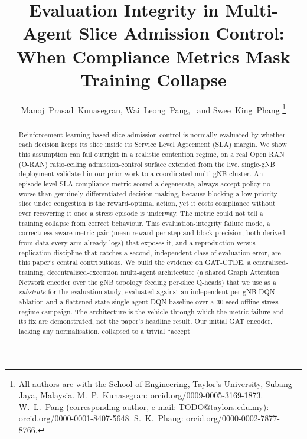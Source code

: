 \documentclass[journal]{IEEEtran}
\begin{document}
\title{Evaluation Integrity in Multi-Agent Slice Admission Control:\\When Compliance Metrics Mask Training Collapse}

\author{Manoj~Prasad~Kunasegran, Wai~Leong~Pang,~ and Swee~King~Phang
\thanks{All authors are with the School of Engineering, Taylor's University, Subang Jaya, Malaysia. M.~P.~Kunasegran: orcid.org/0009-0005-3169-1873. W.~L.~Pang (corresponding author, e-mail: TODO@taylors.edu.my): orcid.org/0000-0001-8407-5648. S.~K.~Phang: orcid.org/0000-0002-7877-8766.}}

\maketitle

\begin{abstract}
Reinforcement-learning-based slice admission control is normally
evaluated by whether each decision keeps its slice inside its Service
Level Agreement (SLA) margin. We show this assumption can fail
outright in a realistic contention regime, on a real Open RAN (O-RAN)
ratio-ceiling admission-control surface extended from the live,
single-gNB deployment validated in our prior work to a coordinated
multi-gNB cluster. An episode-level SLA-compliance metric scored a
degenerate, always-accept policy no worse than genuinely
differentiated decision-making, because blocking a low-priority slice
under congestion is the reward-optimal action, yet it costs compliance
without ever recovering it once a stress episode is underway. The
metric could not tell a training collapse from correct behaviour. This
evaluation-integrity failure mode, a correctness-aware metric pair
(mean reward per step and block precision, both derived from data
every arm already logs) that exposes it, and a reproduction-versus-
replication discipline that catches a second, independent class of
evaluation error, are this paper's central contributions. We build the
evidence on GAT-CTDE, a centralised-training, decentralised-execution
multi-agent architecture (a shared Graph Attention Network encoder
over the gNB topology feeding per-slice Q-heads) that we use as a
\emph{substrate} for the evaluation study, evaluated against an
independent per-gNB DQN ablation and a flattened-state single-agent
DQN baseline over a 30-seed offline stress-regime campaign. The
architecture is the vehicle through which the metric failure and its
fix are demonstrated, not the paper's headline result. Our initial GAT
encoder, lacking any normalisation, collapsed to a trivial ``accept

\end{abstract}
\end{document}
